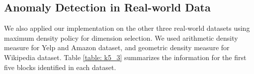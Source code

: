 
\subsection{Anomaly Detection in Real-world Data}
We also applied our implementation on the other three real-world datasets using maximum density policy for dimension selection. We used arithmetic density measure for Yelp and Amazon dataset, and geometric density measure for Wikipedia dataset. Table \ref{table: k5_3} summarizes the information for the first five blocks identified in each dataset.

